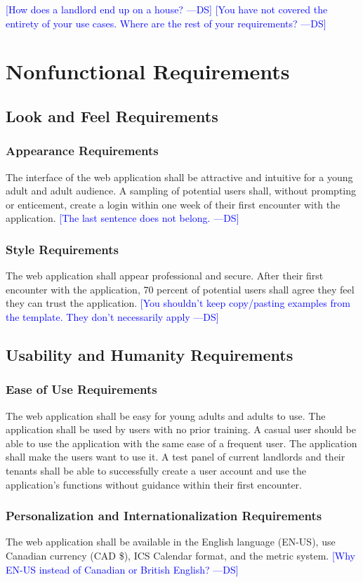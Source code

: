 \documentclass[12pt, titlepage]{article}
\newcommand{\authornote}[3]{\textcolor{#1}{[#3 ---#2]}}
\newcommand{\authornote}[3]{}
\newcommand{\ds}[1]{\authornote{blue}{DS}{#1}}
\begin{document}
{\ds{How does a landlord end up on a house?}
\ds{You have not covered the entirety of your use cases. Where are the rest of
	your requirements?}
        
\section{Nonfunctional Requirements}
\subsection{Look and Feel Requirements}
\subsubsection{Appearance Requirements}
The interface of the web application shall be attractive and intuitive for a 
young adult and adult audience. A sampling of potential users shall, without 
prompting or enticement, create a login within one week of their first encounter 
with the application. 
\ds{The last sentence does not belong.}

\subsubsection{Style Requirements}
The web application shall appear professional and secure. After their first 
encounter with the application, 70 percent of potential users shall agree they 
feel they can trust the application. 
\ds{You shouldn't keep copy/pasting examples from the template. They don't
	necessarily apply}

\subsection{Usability and Humanity Requirements}
\subsubsection{Ease of Use Requirements}
The web application shall be easy for young adults and adults to use. The 
application shall be used by users with no prior training. A casual user should 
be able to use the application with the same ease of a frequent user. The 
application shall make the users want to use it. A test panel of current 
landlords and their tenants shall be able to successfully create a user account 
and use the application's functions without guidance within their first 
encounter.
\subsubsection{Personalization and Internationalization Requirements}
The web application shall be available in the English language (EN-US),  use 
Canadian currency (CAD \$), ICS Calendar format, and the metric system.
\ds{Why EN-US instead of Canadian or British English?}
}
\end{document}

